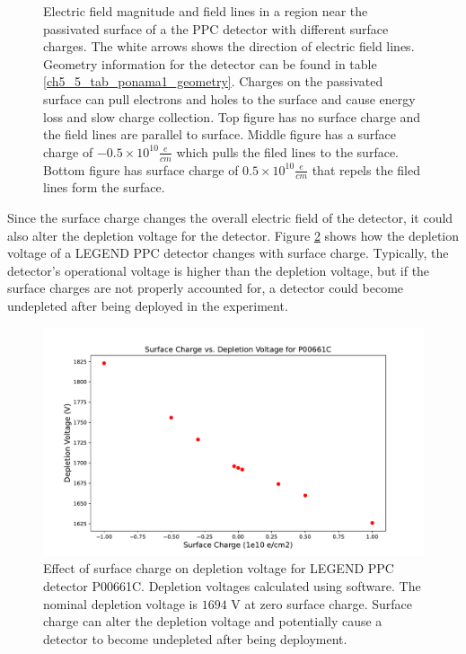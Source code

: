 \begin{figure}
\caption{Electric field magnitude and field lines in a region near the passivated surface of a the {\ponama} PPC detector with different surface charges. The white arrows shows the direction of electric field lines. Geometry information for the detector can be found in table \ref{ch5_5_tab_ponama1_geometry}. Charges on the passivated surface can pull electrons and holes to the surface and cause energy loss and slow charge collection. Top figure has no surface charge and the field lines are parallel to surface. Middle figure has a surface charge of $-0.5 \times 10^{10} \frac{e}{cm}$ which pulls the filed lines to the surface. Bottom figure has surface charge of $0.5 \times 10^{10} \frac{e}{cm}$ that repels the filed lines form the surface.}
\label{ch3_fig_surface_field_sc0}
\end{figure}

Since the surface charge changes the overall electric field of the detector, it could also alter the depletion voltage for the detector. Figure \ref{ch3_fig_deplection_sc} shows how the depletion voltage of a LEGEND PPC detector changes with surface charge. Typically, the detector's operational voltage is higher than the depletion voltage, but if the surface charges are not properly accounted for, a detector could become undepleted after being deployed in the experiment.

\begin{figure}[!htb]
\centering
\includegraphics[trim={1cm 0.4cm 1cm 1.75cm},clip,width=0.99\linewidth]{ch3/figs/deplep_sc.pdf}
 \caption{Effect of surface charge on depletion voltage for LEGEND PPC detector P00661C. Depletion voltages calculated using {\siggen} software. The nominal depletion voltage is $1694$ V at zero surface charge. Surface charge can alter the depletion voltage and potentially cause a detector to become undepleted after being deployment.
}
\label{ch3_fig_deplection_sc}
  \end{figure}

